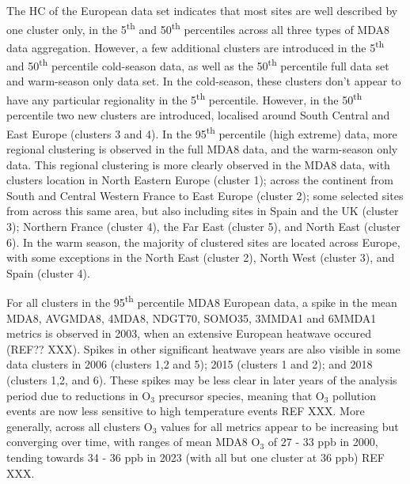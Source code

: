 \documentclass[journal abbreviation, manuscript]{copernicus}
\begin{document}
The HC of the European data set indicates that most sites are well described by one cluster only, in the 5\textsuperscript{th} and 50\textsuperscript{th} percentiles across all three types of MDA8 data aggregation. However, a few additional clusters are introduced in the 5\textsuperscript{th} and 50\textsuperscript{th} percentile cold-season data, as well as the 50\textsuperscript{th} percentile full data set and warm-season only data set. In the cold-season, these clusters don't appear to have any particular regionality in the 5\textsuperscript{th} percentile. However, in the 50\textsuperscript{th} percentile two new clusters are introduced, localised around South Central and East Europe (clusters 3 and 4). In the 95\textsuperscript{th} percentile (high extreme) data, more regional clustering is observed in the full MDA8 data, and the warm-season only data. This regional clustering is more clearly observed in the MDA8 data, with clusters location in North Eastern Europe (cluster 1); across the continent from South and Central Western France to East Europe (cluster 2); some selected sites from across this same area, but also including sites in Spain and the UK (cluster 3); Northern France (cluster 4), the Far East (cluster 5), and North East (cluster 6). In the warm season, the majority of clustered sites are located across Europe, with some exceptions in the North East (cluster 2), North West (cluster 3), and Spain (cluster 4).

For all clusters in the 95\textsuperscript{th} percentile MDA8 European data, a spike in the mean MDA8, AVGMDA8, 4MDA8, NDGT70, SOMO35, 3MMDA1 and 6MMDA1 metrics is observed in 2003, when an extensive European heatwave occured (REF?? XXX). Spikes in other significant heatwave years are also visible in some data clusters in 2006 (clusters 1,2 and 5); 2015 (clusters 1 and 2); and 2018 (clusters 1,2, and 6). These spikes may be less clear in later years of the analysis period due to reductions in O$_3$ precursor species, meaning that O$_3$ pollution events are now less sensitive to high temperature events REF XXX. More generally, across all clusters O$_3$ values for all metrics appear to be increasing but converging over time, with ranges of mean MDA8 O$_3$ of 27 - 33 ppb in 2000, tending towards 34 - 36 ppb in 2023 (with all but one cluster at 36 ppb) REF XXX.
\end{document}
